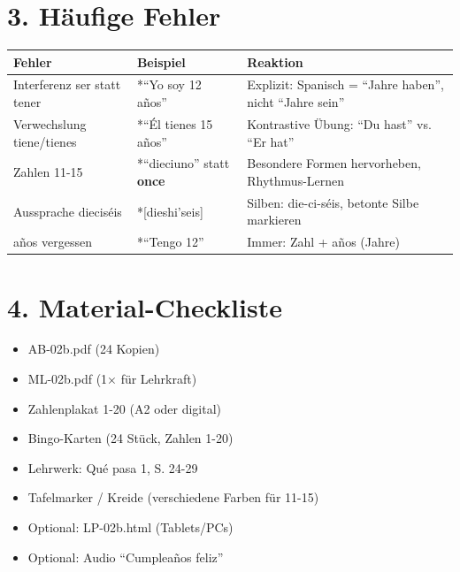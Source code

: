 \documentclass[11pt, a4paper]{article}
\newcommand{\fachfarbe}{spanisch}
\newcommand{\lerngruppengroesse}{24}
\newcommand{\es}[1]{\textcolor{\fachfarbe}{\textbf{#1}}}
\begin{document}
\section*{3. Häufige Fehler}

\begin{fehlerbox}
\begin{tabularx}{\textwidth}{|l|X|X|}
\hline
\textbf{Fehler} & \textbf{Beispiel} & \textbf{Reaktion} \\
\hline
Interferenz ser statt tener & *``Yo soy 12 años'' & Explizit: Spanisch = ``Jahre haben'', nicht ``Jahre sein'' \\
\hline
Verwechslung tiene/tienes & *``Él tienes 15 años'' & Kontrastive Übung: ``Du hast'' vs. ``Er hat'' \\
\hline
Zahlen 11-15 & *``dieciuno'' statt \es{once} & Besondere Formen hervorheben, Rhythmus-Lernen \\
\hline
Aussprache dieciséis & *[dieshi'seis] & Silben: die-ci-séis, betonte Silbe markieren \\
\hline
años vergessen & *``Tengo 12'' & Immer: Zahl + años (Jahre) \\
\hline
\end{tabularx}
\end{fehlerbox}


\section*{4. Material-Checkliste}

\begin{materialbox}
\begin{itemize}[label=$\square$]
    \item AB-02b.pdf (\lerngruppengroesse{} Kopien)
    \item ML-02b.pdf (1× für Lehrkraft)
    \item Zahlenplakat 1-20 (A2 oder digital)
    \item Bingo-Karten (\lerngruppengroesse{} Stück, Zahlen 1-20)
    \item Lehrwerk: Qué pasa 1, S. 24-29
    \item Tafelmarker / Kreide (verschiedene Farben für 11-15)
    \item Optional: LP-02b.html (Tablets/PCs)
    \item Optional: Audio ``Cumpleaños feliz''
\end{itemize}
\end{materialbox}
\end{document}
